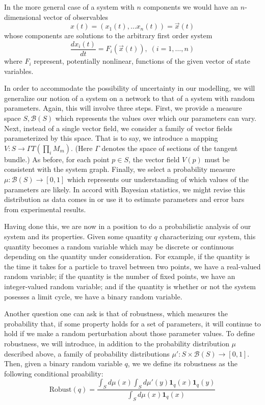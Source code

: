 In the more general case of a system with $n$ components we would have an $n$-dimensional vector of observables
$$
x(t) = (x_1(t), \ldots x_n(t)) = \vec{x}(t)
$$
whose components are solutions to the arbitrary first order system
$$
\frac{dx_i(t)}{dt} = F_i(\vec{x}(t)), \; (i=1,\ldots,n)
$$
where $F_i$ represent, potentially nonlinear, functions of the given vector of state variables.

In order to accommodate the possibility of uncertainty in our modelling,
we will generalize our notion of a system on a network to that of a
system with random parameters.  Again, this will involve three
steps. First, we provide a measure space $S, \mathcal{B}(S)$ which represents the
values over which our parameters can vary. Next, instead of a single
vector field, we consider a family of vector fields parameterized by
this space. That is to say, we introduce a mapping $V \colon S \to \Gamma T(\prod_i M_m)$.
(Here $\Gamma$ denotes the space of sections of the tangent bundle.)
As before, for each point $p \in S$, the vector field $V(p)$ must be consistent with
the system graph. Finally, we select a probability measure $\mu \colon
\mathcal{B}(S) \to [0,1]$ which represents our understanding of which values of the parameters
are likely. In accord with Bayesian statistics, we might revise this
distribution as data comes in or use it to estimate parameters and error
bars from experimental results.

Having done this, we are now in a position to do a probabilistic analysis
of our system and its properties.  Given some quantity $q$ characterizing
our system, this quantity becomes a random variable which may be discrete or
continuous depending on the quantity under consideration.  For example, if
the quantity is the time it takes for a particle to travel between two points,
we have a real-valued random variable; if the quantity is the number of fixed
points, we have an integer-valued random variable; and if the quantity is
whether or not the system posesses a limit cycle, we have a binary random
variable.

Another question one can ask is that of robustness, which measures the
probability that, if some property holds for a set of parameters, it will
continue to hold if we make a random perturbation about those parameter values.
To define robustness, we will introduce, in addition to the probability
distribution $\mu$ described above, a family of probability distributions
$\mu' \colon S \times \mathcal{B}(S) \to [0,1]$.  Then, given a binary random
variable $q$, we we define its robustness as the following conditional proability:
\[
  \mathrm{Robust} (q) =
  \frac{\int_S d\mu(x) \int_S d\mu'(y) \mathbf{1}_q(x) \mathbf{1}_q(y)}
  {\int_S d\mu(x) \mathbf{1}_q(x)}
\]

